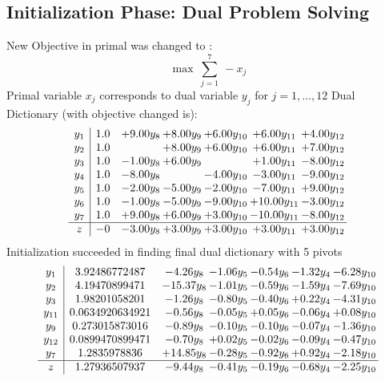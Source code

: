 \documentclass[8pt]{article}
\begin{document}
\subsection{Initialization Phase: Dual Problem Solving}
New Objective in primal was changed to : \[ \max\ \sum_{j=1}^{7}\ - x_j \] 
Primal variable $x_j$ corresponds to dual variable $y_j$ for $j = 1,\ldots,12$
Dual Dictionary (with objective changed is): 
\[\begin{array}{c| c c@{\hskip 2pt} c@{\hskip 2pt} c@{\hskip 2pt} c@{\hskip 2pt} c@{\hskip 2pt} }
 y_{1}   &  1.0 & +  9.00 y_{8} & +  8.00 y_{9} & +  6.00 y_{10} & +  6.00 y_{11} & +  4.00 y_{12}\\
 y_{2}   &  1.0  &   & +  8.00 y_{9} & +  6.00 y_{10} & +  6.00 y_{11} & +  7.00 y_{12}\\
 y_{3}   &  1.0 & -1.00 y_{8} & +  6.00 y_{9} &   & +  1.00 y_{11} & -8.00 y_{12}\\
 y_{4}   &  1.0 & -8.00 y_{8} &   & -4.00 y_{10} & -3.00 y_{11} & -9.00 y_{12}\\
 y_{5}   &  1.0 & -2.00 y_{8} & -5.00 y_{9} & -2.00 y_{10} & -7.00 y_{11} & +  9.00 y_{12}\\
 y_{6}   &  1.0 & -1.00 y_{8} & -5.00 y_{9} & -9.00 y_{10} & + 10.00 y_{11} & -3.00 y_{12}\\
 y_{7}   &  1.0 & +  9.00 y_{8} & +  6.00 y_{9} & +  3.00 y_{10} & -10.00 y_{11} & -8.00 y_{12}\\
\hline
z    &  -0 & -3.00 y_{8} & +  3.00 y_{9} & +  3.00 y_{10} & +  3.00 y_{11} & +  3.00 y_{12}\\
\end{array}\]
Initialization succeeded in finding final dual dictionary with 5 pivots
\[\begin{array}{c| c c@{\hskip 2pt} c@{\hskip 2pt} c@{\hskip 2pt} c@{\hskip 2pt} c@{\hskip 2pt} }
 y_{1}   &  3.92486772487 & -4.26 y_{8} & -1.06 y_{5} & -0.54 y_{6} & -1.32 y_{4} & -6.28 y_{10}\\
 y_{2}   &  4.19470899471 & -15.37 y_{8} & -1.01 y_{5} & -0.59 y_{6} & -1.59 y_{4} & -7.69 y_{10}\\
 y_{3}   &  1.98201058201 & -1.26 y_{8} & -0.80 y_{5} & -0.40 y_{6} & +  0.22 y_{4} & -4.31 y_{10}\\
 y_{11}   &  0.0634920634921 & -0.56 y_{8} & -0.05 y_{5} & +  0.05 y_{6} & -0.06 y_{4} & +  0.08 y_{10}\\
 y_{9}   &  0.273015873016 & -0.89 y_{8} & -0.10 y_{5} & -0.10 y_{6} & -0.07 y_{4} & -1.36 y_{10}\\
 y_{12}   &  0.0899470899471 & -0.70 y_{8} & +  0.02 y_{5} & -0.02 y_{6} & -0.09 y_{4} & -0.47 y_{10}\\
 y_{7}   &  1.2835978836 & + 14.85 y_{8} & -0.28 y_{5} & -0.92 y_{6} & +  0.92 y_{4} & -2.18 y_{10}\\
\hline
z    &  1.27936507937 & -9.44 y_{8} & -0.41 y_{5} & -0.19 y_{6} & -0.68 y_{4} & -2.25 y_{10}\\
\end{array}\]
\end{document}

